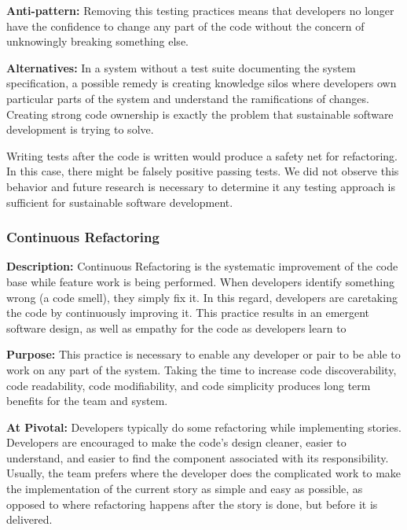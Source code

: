 \begin{table}[]
\textbf{Anti-pattern:} Removing this testing practices means that developers no longer have the confidence to change any part of the code without the concern of unknowingly breaking something else. 

\textbf{Alternatives:} In a system without a test suite documenting the system specification, a possible remedy is creating knowledge silos where developers own particular parts of the system and understand the ramifications of changes. Creating strong code ownership is exactly the problem that sustainable software development is trying to solve.

Writing tests after the code is written would produce a safety net for refactoring. In this case, there might be falsely positive passing tests. We did not observe this behavior and future research is necessary to determine it any testing approach is sufficient for sustainable software development.

\subsubsection{Continuous Refactoring}
\textbf{Description:} Continuous Refactoring is the systematic improvement of the code base while feature work is being performed. When developers identify something wrong (a code smell), they simply fix it. In this regard, developers are caretaking the code by continuously improving it. This practice results in an emergent software design, as well as empathy for the code as developers learn to  


\textbf{Purpose:} This practice is necessary to enable any developer or pair to be able to work on any part of the system. Taking the time to increase code discoverability, code readability, code modifiability, and code simplicity produces long term benefits for the team and system. 

\textbf{At Pivotal:} Developers typically do some refactoring while implementing stories. Developers are encouraged to make the code's design cleaner, easier to understand, and easier to find the component associated with its responsibility. Usually, the team prefers  where the developer does the complicated work to make the implementation of the current story as simple and easy as possible, as opposed to  where refactoring happens after the story is done, but before it is delivered.  


\end{table}
